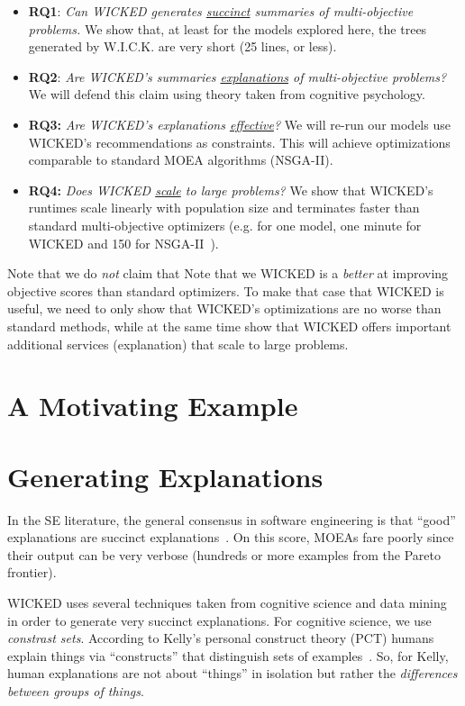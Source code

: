 \documentclass[runningheads]{llncs}
\newcommand{\bi}{\begin{itemize}}
\newcommand{\ei}{\end{itemize}}
\begin{document}
\bi
\item[{\bf RQ1}:] {\em Can WICKED generates \underline{succinct} summaries of multi-objective problems.} 
We show that, at least for the models explored here, the trees
generated by W.I.C.K. are very short (25 lines, or less).
\item[{\bf RQ2}:] {\em Are WICKED's summaries \underline{explanations} of multi-objective problems?}
We will defend this claim using theory taken from cognitive psychology.
\item[{\bf RQ3:}] {\em Are WICKED's  explanations \underline{effective}?}
We will re-run our models use WICKED's 
recommendations as constraints. This will  achieve optimizations comparable
to standard MOEA algorithms (NSGA-II).
\item [{\bf RQ4:}] {\em Does WICKED \underline{scale} to large problems?}
 We show that WICKED's
runtimes scale linearly with population size and terminates
faster than standard multi-objective optimizers
 (e.g. for one model, one minute for WICKED and 150 for NSGA-II~\cite{deb00a}).
\ei
Note that we do {\em not} claim that Note that we WICKED is a
{\em better} at improving objective
scores than standard optimizers.  To make that case that WICKED is useful,
we need to only show that WICKED's optimizations are no worse than standard methods,
while at the same time show that WICKED offers important additional services (explanation)
that scale to large problems.


\section{A Motivating Example}


\section{Generating Explanations}
In the SE literature,
the general consensus in
software engineering is that ``good'' explanations
are succinct explanations~\cite{ag98,dej13z,fenton99}.
On this score, MOEAs fare poorly since their output can be very verbose
(hundreds or more examples from the Pareto frontier).

WICKED uses several techniques taken from cognitive science
and data mining in order to generate very succinct explanations.
For cognitive science, we use {\em constrast sets}.
According to Kelly's personal
construct theory (PCT) humans explain things via
``constructs'' that distinguish sets of examples~\cite{kelly55}.
So, for Kelly, human explanations are not about
``things'' in isolation but rather the {\em
differences between groups of things}. 
\end{document}
